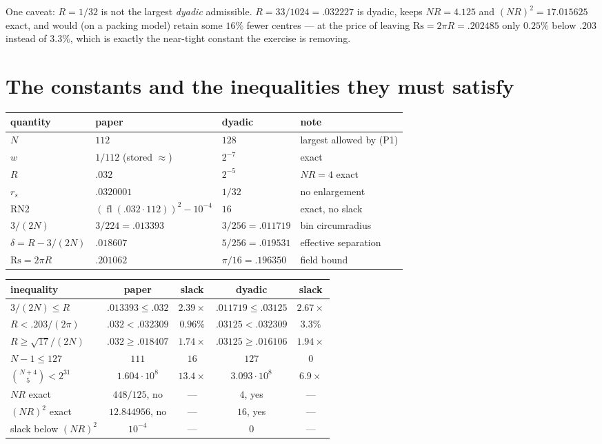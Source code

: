 \documentclass[11pt]{article}
\newcommand{\fl}{\operatorname{fl}}
\begin{document}
One caveat: $R=1/32$ is not the largest \emph{dyadic} admissible. $R=33/1024=.032227$ is dyadic,
keeps $NR=4.125$ and $(NR)^2=17.015625$ exact, and would (on a packing model) retain some $16\%$
fewer centres --- at the price of leaving $\mathrm{Rs}=2\pi R=.202485$ only $0.25\%$ below $.203$
instead of $3.3\%$, which is exactly the near-tight constant the exercise is removing.

\section{The constants and the inequalities they must satisfy}

\begin{center}
\begin{tabular}{llll}
\toprule
quantity & paper & dyadic & note\\
\midrule
$N$ & $112$ & $128$ & largest allowed by (P1)\\
$w$ & $1/112$ (stored $\approx$) & $2^{-7}$ & exact\\
$R$ & $.032$ & $2^{-5}$ & $NR=4$ exact\\
$r_s$ & $.0320001$ & $1/32$ & no enlargement\\
$\mathrm{RN2}$ & $(\fl(.032\cdot112))^2-10^{-4}$ & $16$ & exact, no slack\\
$3/(2N)$ & $3/224=.013393$ & $3/256=.011719$ & bin circumradius\\
$\delta=R-3/(2N)$ & $.018607$ & $5/256=.019531$ & effective separation\\
$\mathrm{Rs}=2\pi R$ & $.201062$ & $\pi/16=.196350$ & field bound\\
\bottomrule
\end{tabular}
\end{center}

\begin{center}
\begin{tabular}{lcccc}
\toprule
inequality & paper & slack & dyadic & slack\\
\midrule
$3/(2N)\le R$ & $.013393\le.032$ & $2.39\times$ & $.011719\le.03125$ & $2.67\times$\\
$R<.203/(2\pi)$ & $.032<.032309$ & $0.96\%$ & $.03125<.032309$ & $3.3\%$\\
$R\ge\sqrt{17}/(2N)$ & $.032\ge.018407$ & $1.74\times$ & $.03125\ge.016106$ & $1.94\times$\\
$N-1\le127$ & $111$ & $16$ & $127$ & $0$\\
$\binom{N+4}{5}<2^{31}$ & $1.604\cdot10^8$ & $13.4\times$ & $3.093\cdot10^8$ & $6.9\times$\\
$NR$ exact & $448/125$, no & --- & $4$, yes & ---\\
$(NR)^2$ exact & $12.844956$, no & --- & $16$, yes & ---\\
slack below $(NR)^2$ & $10^{-4}$ & --- & $0$ & ---\\
\bottomrule
\end{tabular}
\end{center}
\end{document}
